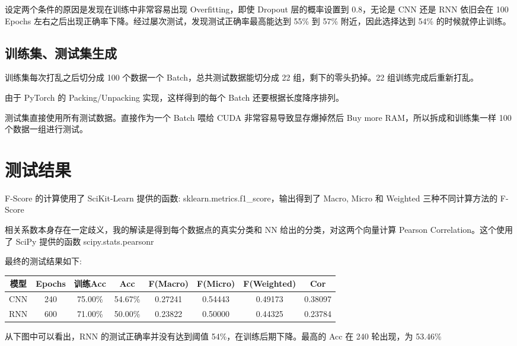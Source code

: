 \documentclass{ctexart}
\begin{document}
设定两个条件的原因是发现在训练中非常容易出现 Overfitting，即使 Dropout 层的概率设置到 0.8，无论是 CNN 还是 RNN 依旧会在 100 Epochs 左右之后出现正确率下降。经过屡次测试，发现测试正确率最高能达到 55\% 到 57\% 附近，因此选择达到 54\% 的时候就停止训练。


\subsection{训练集、测试集生成}
训练集每次打乱之后切分成 100 个数据一个 Batch，总共测试数据能切分成 22 组，剩下的零头扔掉。22 组训练完成后重新打乱。

由于 PyTorch 的 Packing/Unpacking 实现，这样得到的每个 Batch 还要根据长度降序排列。

测试集直接使用所有测试数据。直接作为一个 Batch 喂给 CUDA 非常容易导致显存爆掉然后 Buy more RAM，所以拆成和训练集一样 100 个数据一组进行测试。

\section{测试结果}

F-Score 的计算使用了 SciKit-Learn 提供的函数: sklearn.metrics.f1\_score，输出得到了 Macro, Micro 和 Weighted 三种不同计算方法的 F-Score

相关系数本身存在一定歧义，我的解读是得到每个数据点的真实分类和 NN 给出的分类，对这两个向量计算 Pearson Correlation。这个使用了 SciPy 提供的函数 scipy.stats.pearsonr

最终的测试结果如下:


\begin{table}[ht]
\centering

\begin{tabular}{|c||c|c||c|c|c|c|c|}
\hline
模型 & Epochs & 训练Acc & Acc & F(Macro) & F(Micro) & F(Weighted) & Cor \\
\hline
\hline
CNN & 240 & 75.00\% & 54.67\% & 0.27241 & 0.54443 & 0.49173 & 0.38097 \\
\hline
RNN & 600 & 71.00\% & 50.00\% & 0.23822 & 0.50000 & 0.44325 & 0.23784 \\
\hline
\end{tabular}
\end{table}

从下图中可以看出，RNN 的测试正确率并没有达到阈值 54\%，在训练后期下降。最高的 Acc 在 240 轮出现，为 53.46\%
\end{document}
